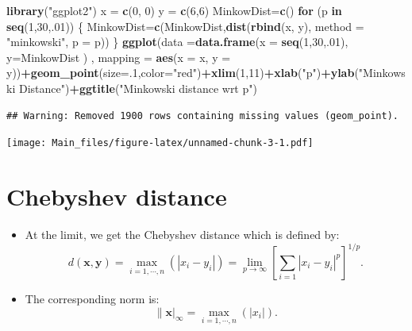 \documentclass[
]{article}
\newenvironment{Shaded}{\begin{snugshade}}{\end{snugshade}}
\newcommand{\ControlFlowTok}[1]{\textcolor[rgb]{0.13,0.29,0.53}{\textbf{#1}}}
\newcommand{\DataTypeTok}[1]{\textcolor[rgb]{0.13,0.29,0.53}{#1}}
\newcommand{\DecValTok}[1]{\textcolor[rgb]{0.00,0.00,0.81}{#1}}
\newcommand{\KeywordTok}[1]{\textcolor[rgb]{0.13,0.29,0.53}{\textbf{#1}}}
\newcommand{\NormalTok}[1]{#1}
\newcommand{\OperatorTok}[1]{\textcolor[rgb]{0.81,0.36,0.00}{\textbf{#1}}}
\newcommand{\StringTok}[1]{\textcolor[rgb]{0.31,0.60,0.02}{#1}}
\providecommand{\tightlist}{%
  \setlength{\itemsep}{0pt}\setlength{\parskip}{0pt}}
\begin{document}
\begin{Shaded}
\begin{Highlighting}[]
\KeywordTok{library}\NormalTok{(}\StringTok{"ggplot2"}\NormalTok{)}
\NormalTok{x =}\StringTok{ }\KeywordTok{c}\NormalTok{(}\DecValTok{0}\NormalTok{, }\DecValTok{0}\NormalTok{)}
\NormalTok{y =}\StringTok{ }\KeywordTok{c}\NormalTok{(}\DecValTok{6}\NormalTok{,}\DecValTok{6}\NormalTok{)}
\NormalTok{MinkowDist=}\KeywordTok{c}\NormalTok{()}
\ControlFlowTok{for}\NormalTok{ (p }\ControlFlowTok{in} \KeywordTok{seq}\NormalTok{(}\DecValTok{1}\NormalTok{,}\DecValTok{30}\NormalTok{,.}\DecValTok{01}\NormalTok{))}
\NormalTok{\{}
\NormalTok{MinkowDist=}\KeywordTok{c}\NormalTok{(MinkowDist,}\KeywordTok{dist}\NormalTok{(}\KeywordTok{rbind}\NormalTok{(x, y), }\DataTypeTok{method =} \StringTok{"minkowski"}\NormalTok{, }\DataTypeTok{p =}\NormalTok{ p))     }
\NormalTok{\}}
\KeywordTok{ggplot}\NormalTok{(}\DataTypeTok{data =}\KeywordTok{data.frame}\NormalTok{(}\DataTypeTok{x =} \KeywordTok{seq}\NormalTok{(}\DecValTok{1}\NormalTok{,}\DecValTok{30}\NormalTok{,.}\DecValTok{01}\NormalTok{), }\DataTypeTok{y=}\NormalTok{MinkowDist ) , }\DataTypeTok{mapping =} \KeywordTok{aes}\NormalTok{(}\DataTypeTok{x =}\NormalTok{ x, }\DataTypeTok{y =}\NormalTok{ y))}\OperatorTok{+}\KeywordTok{geom_point}\NormalTok{(}\DataTypeTok{size=}\NormalTok{.}\DecValTok{1}\NormalTok{,}\DataTypeTok{color=}\StringTok{"red"}\NormalTok{)}\OperatorTok{+}\KeywordTok{xlim}\NormalTok{(}\DecValTok{1}\NormalTok{,}\DecValTok{11}\NormalTok{)}\OperatorTok{+}\KeywordTok{xlab}\NormalTok{(}\StringTok{"p"}\NormalTok{)}\OperatorTok{+}\KeywordTok{ylab}\NormalTok{(}\StringTok{"Minkowski Distance"}\NormalTok{)}\OperatorTok{+}\KeywordTok{ggtitle}\NormalTok{(}\StringTok{"Minkowski distance wrt p"}\NormalTok{)}
\end{Highlighting}
\end{Shaded}

\begin{verbatim}
## Warning: Removed 1900 rows containing missing values (geom_point).
\end{verbatim}

\texttt{[image: Main\_files/figure-latex/unnamed-chunk-3-1.pdf]}

\hypertarget{chebyshev-distance}{%
\section{Chebyshev distance}\label{chebyshev-distance}}

\begin{itemize}
\tightlist
\item
  At the limit, we get the Chebyshev distance which is defined by: \[
  d(\mathbf{x},\mathbf{y})=\max_{i=1,\cdots,n}(|x_i-y_i|)=\lim_{p\rightarrow\infty}
  \left[\sum_{i=1} |x_i-y_i|^{p}\right]^{1/p}.
  \]
\item
  The corresponding norm is: \[
  \|\mathbf{x}|_\infty=\max_{i=1,\cdots,n}(|x_i|).
  \]
\end{itemize}
\end{document}
